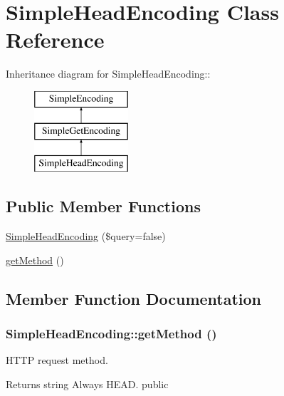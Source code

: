\hypertarget{class_simple_head_encoding}{
\section{SimpleHeadEncoding Class Reference}
\label{class_simple_head_encoding}
}
Inheritance diagram for SimpleHeadEncoding::\begin{figure}[H]
\begin{center}
\leavevmode
\includegraphics[height=3cm]{class_simple_head_encoding}
\end{center}
\end{figure}
\subsection*{Public Member Functions}
\begin{DoxyCompactItemize}
\item 
\hyperlink{class_simple_head_encoding_a6e727e185e5b64646236a395959aaaf6}{SimpleHeadEncoding} (\$query=false)
\item 
\hyperlink{class_simple_head_encoding_acaa746a7c7f8b5c032d5c35504ab68d7}{getMethod} ()
\end{DoxyCompactItemize}


\subsection{Member Function Documentation}
\hypertarget{class_simple_head_encoding_acaa746a7c7f8b5c032d5c35504ab68d7}{
\subsubsection[{getMethod}]{\setlength{\rightskip}{0pt plus 5cm}SimpleHeadEncoding::getMethod ()}}
\label{class_simple_head_encoding_acaa746a7c7f8b5c032d5c35504ab68d7}
HTTP request method. \begin{DoxyReturn}{Returns}
string Always HEAD.  public 
\end{DoxyReturn}


